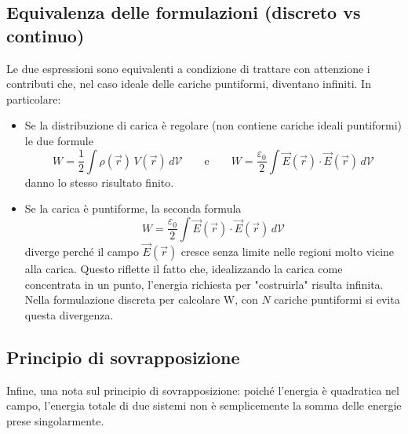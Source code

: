 \documentclass{book}
\begin{document}
\subsection*{Equivalenza delle formulazioni (discreto vs continuo)} 

Le due espressioni sono equivalenti a condizione di trattare con attenzione i contributi che, nel caso ideale delle cariche puntiformi, diventano infiniti. In particolare:
\begin{itemize}
\item Se la distribuzione di carica è regolare (non contiene cariche ideali puntiformi) le due formule
\[
W = \frac{1}{2}\int \rho(\vec r)\,V(\vec r)\,d\mathcal V
\qquad\text{e}\qquad
W = \frac{\varepsilon_0}{2}\int \vec E(\vec r)\cdot\vec E(\vec r)\,d\mathcal V
\]
danno lo stesso risultato finito.
\item Se la carica è puntiforme, la seconda formula
\[
W = \frac{\varepsilon_0}{2}\int \vec E(\vec r)\cdot\vec E(\vec r)\,d\mathcal V
\]
diverge perché il campo \(\vec E(\vec r)\) cresce senza limite nelle regioni molto vicine alla carica. Questo riflette il fatto che, idealizzando la carica come concentrata in un punto, l'energia richiesta per "costruirla" risulta infinita. Nella formulazione discreta per calcolare W, con \(N\) cariche puntiformi si evita questa divergenza.
\end{itemize}

\subsection*{Principio di sovrapposizione}

Infine, una nota sul principio di sovrapposizione: poiché l'energia è quadratica nel campo, l'energia totale di due sistemi non è semplicemente la somma delle energie prese singolarmente.
\end{document}
